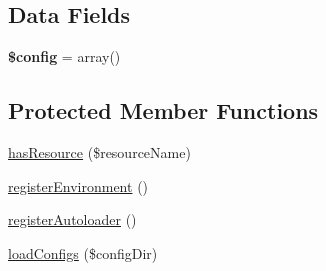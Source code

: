 \subsection*{Data Fields}
\begin{DoxyCompactItemize}
\item 
\hypertarget{class_anemo_1_1_application_1_1_bootstrap_1_1_bootstrap_abstract_a49c7011be9c979d9174c52a8b83e5d8e}{
{\bfseries \$config} = array()}
\label{class_anemo_1_1_application_1_1_bootstrap_1_1_bootstrap_abstract_a49c7011be9c979d9174c52a8b83e5d8e}

\end{DoxyCompactItemize}
\subsection*{Protected Member Functions}
\begin{DoxyCompactItemize}
\item 
\hyperlink{class_anemo_1_1_application_1_1_bootstrap_1_1_bootstrap_abstract_ab399a9a58e8edb13390ad0f075d9d303}{hasResource} (\$resourceName)
\item 
\hyperlink{class_anemo_1_1_application_1_1_bootstrap_1_1_bootstrap_abstract_a2ea35eea46b3f3c02ea3aeb5746814c3}{registerEnvironment} ()
\item 
\hyperlink{class_anemo_1_1_application_1_1_bootstrap_1_1_bootstrap_abstract_a45a95245e446802579093fb7a15856a0}{registerAutoloader} ()
\item 
\hyperlink{class_anemo_1_1_application_1_1_bootstrap_1_1_bootstrap_abstract_a0236e4f61d022d5315ffdb89310c1e43}{loadConfigs} (\$configDir)
\end{DoxyCompactItemize}
